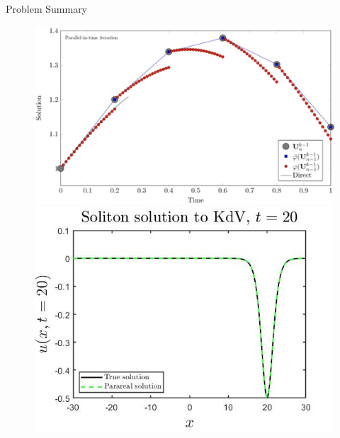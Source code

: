 \documentclass{beamer}
\begin{document}
\begin{frame}{Problem Summary}
\begin{figure}[hb]
    \centering
    \includegraphics[scale=0.1]{Images/parareal2.jpg}
    \pause
    \includegraphics[scale=0.2]{Images/kdv_sol.jpg}
    \label{fig:parareal}
\end{figure}

\end{frame}
\end{document}
